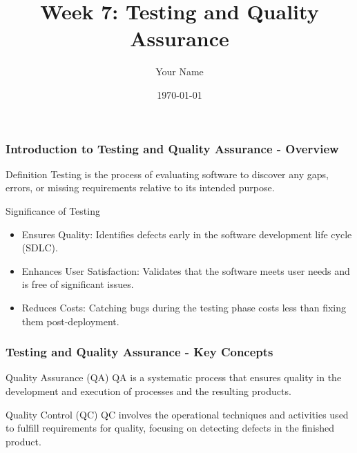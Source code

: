 \documentclass{beamer}
\title{Week 7: Testing and Quality Assurance}
\author{Your Name}
\institute{Your Institution}
\date{\today}
\begin{document}
\frame{\titlepage}

\begin{frame}[fragile]
    \frametitle{Introduction to Testing and Quality Assurance - Overview}
    \begin{block}{Definition}
        Testing is the process of evaluating software to discover any gaps, errors, or missing requirements relative to its intended purpose.
    \end{block}

    \begin{block}{Significance of Testing}
        \begin{itemize}
            \item Ensures Quality: Identifies defects early in the software development life cycle (SDLC).
            \item Enhances User Satisfaction: Validates that the software meets user needs and is free of significant issues.
            \item Reduces Costs: Catching bugs during the testing phase costs less than fixing them post-deployment.
        \end{itemize}
    \end{block}
\end{frame}

\begin{frame}[fragile]
    \frametitle{Testing and Quality Assurance - Key Concepts}
    \begin{block}{Quality Assurance (QA)}
        QA is a systematic process that ensures quality in the development and execution of processes and the resulting products.
    \end{block}

    \begin{block}{Quality Control (QC)}
        QC involves the operational techniques and activities used to fulfill requirements for quality, focusing on detecting defects in the finished product.
    \end{block}
\end{frame}
\end{document}
